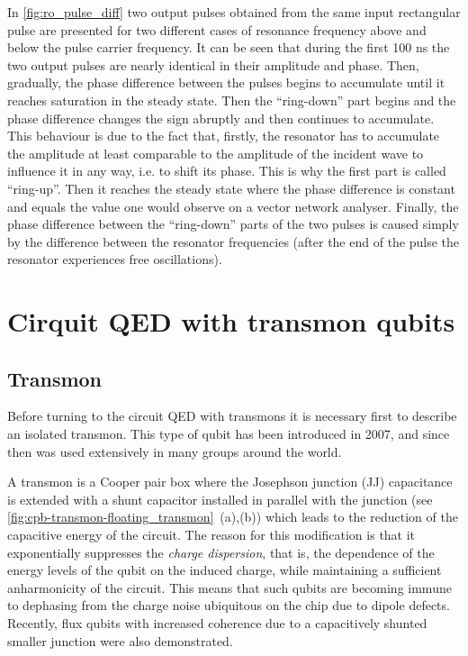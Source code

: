 \documentclass[12pt, twoside]{report}
\numberwithin{equation}{section}
\begin{document}
In \autoref{fig:ro_pulse_diff} two output pulses obtained from the same input rectangular pulse are presented for two different cases of resonance frequency above and below the pulse carrier frequency. It can be seen that during the first 100 ns the two output pulses are nearly identical in their amplitude and phase. Then, gradually, the phase difference between the pulses begins to accumulate until it reaches saturation in the steady state. Then the ``ring-down'' part begins and the phase difference changes the sign abruptly and then continues to accumulate. This behaviour is due to the fact that, firstly, the resonator has to accumulate the amplitude at least comparable to the amplitude of the incident wave to influence it in any way, i.e. to shift its phase. This is why the first part is called ``ring-up''. Then it reaches the steady state where the phase difference is constant and equals the value one would observe on a vector network analyser. Finally, the phase difference between the ``ring-down'' parts of the two pulses is caused simply by the difference between the resonator frequencies (after the end of the pulse the resonator experiences free oscillations).



\newpage

\section{Cirquit QED with transmon qubits}\label{sec:cQED}

\subsection{Transmon}

Before turning to the circuit QED with transmons it is necessary first to describe an isolated transmon. This type of qubit has been introduced\cite{Koch2007} in 2007, and since then was used extensively in many groups around the world. 

A transmon is a Cooper pair box where the Josephson junction (JJ) capacitance is extended with a shunt capacitor installed in parallel with the junction (see \autoref{fig:cpb-transmon-floating_transmon}~(a),(b)) which leads to the reduction of the capacitive energy of the circuit. The reason for this modification is that it exponentially suppresses the \textit{charge dispersion}, that is, the dependence of the energy levels of the qubit on the induced charge, while maintaining a sufficient anharmonicity of the circuit. This means that such qubits are becoming immune to dephasing from the charge noise ubiquitous on the chip due to dipole defects. Recently, flux qubits with increased coherence due to a capacitively shunted smaller junction were also demonstrated\cite{yan2015}.
\end{document}

